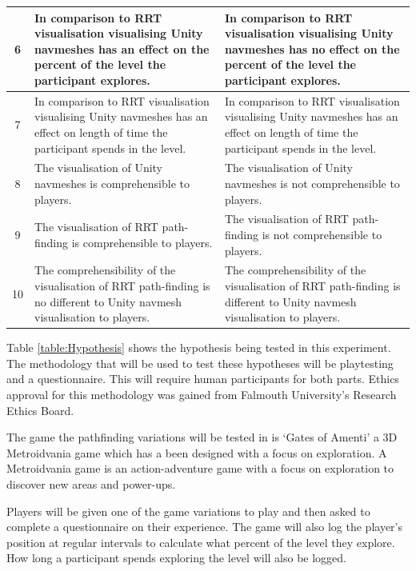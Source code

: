 \documentclass[journal]{IEEEtran}
\begin{document}
\begin{table}[h]
\begin{tabular}{|c|p{7.5cm}|p{7.5cm}|}
			6 & In comparison to RRT visualisation visualising Unity navmeshes has an effect on the percent of the level the participant explores.
			& In comparison to RRT visualisation visualising Unity navmeshes has no effect on the percent of the level the participant explores.
			\\ \hline
			
			7 &  In comparison to RRT visualisation visualising Unity navmeshes has an effect on length of time the participant spends in the level.         
			&   In comparison to RRT visualisation visualising Unity navmeshes has an effect on length of time the participant spends in the level.     
			\\ \hline
			
			8 &   The visualisation of  Unity navmeshes is comprehensible to players.
			&  The visualisation of  Unity navmeshes is not comprehensible to players.
			\\ \hline
			
			9 &  The visualisation of  RRT path-finding is comprehensible to players.
			&  The visualisation of  RRT path-finding is not comprehensible to players.
			\\ \hline
			
			10 &  The comprehensibility of the visualisation of RRT path-finding is no different to Unity navmesh visualisation to players.
			&  The comprehensibility of the visualisation of RRT path-finding is different to Unity navmesh visualisation to players.
			\\ \hline
		\end{tabular}
	\end{table}
	Table \ref{table:Hypothesis} shows the hypothesis being tested in this experiment. The methodology that will be used to test these hypotheses will be playtesting and a questionnaire. This will require human participants for both parts. Ethics approval for this methodology was gained from Falmouth University’s Research Ethics Board.
	
	The game the pathfinding variations will be tested in is `Gates of Amenti' a 3D Metroidvania game which has a been designed with a focus on exploration. A Metroidvania game is an action-adventure game with a focus on exploration to discover new areas and power-ups.
	
	Players will be given one of the game variations to play and then asked to complete a questionnaire on their experience. The game will also log the player's position at regular intervals to calculate what percent of the level they explore. How long a participant spends exploring the level will also be logged.
	
\end{document}
